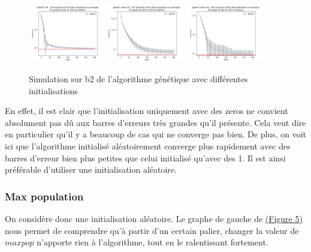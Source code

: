 \documentclass[11pt,french]{report}
\begin{document}
        \begin{figure}
          \includegraphics[width=0.3\textwidth]{best_b2_evaluation_genetic random init.png}
          \includegraphics[width=0.3\textwidth]{best_b2_evaluation_genetic ones init.png}
          \includegraphics[width=0.3\textwidth]{best_b2_evaluation_genetic zeros init.png}
          \caption{Simulation sur b2 de l'algorithme génétique avec différentes initialisations}
          \label{Figure4}
        \end{figure}
        

        En effet, il est clair que l'initialisation uniquement avec des zeros ne convient absolument pas dû aux barres d'erreurs très grandes qu'il présente. Cela veut dire en particulier qu'il y a beaucoup de cas qui ne converge pas bien. De plus, on voit ici que l'algorithme initialisé aléatoirement converge plus rapidement avec des barres d'erreur bien plus petites que celui initialisé qu'avec des 1.
        Il est ainsi préférable d'utiliser une initialisation aléatoire.

        \subsubsection{Max population}
        On considère donc une initialisation aléatoire. Le graphe de gauche de  \hyperref[Figure5]{(Figure 5)} nous permet de comprendre qu'à partir d'un certain palier, changer la valeur de $maxpop$ n'apporte rien à l'algorithme, tout en le ralentissant fortement.
\end{document}
